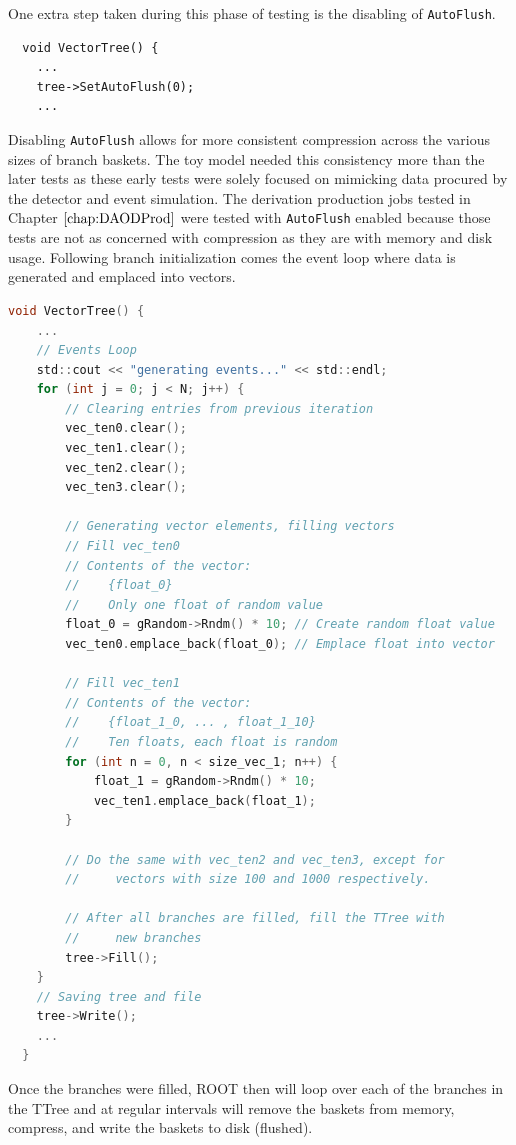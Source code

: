 One extra step taken during this phase of testing is the disabling of \verb|AutoFlush|. 
\begin{lstlisting}
  void VectorTree() {
    ...
    tree->SetAutoFlush(0);
    ...
\end{lstlisting}
Disabling \verb|AutoFlush| allows for more consistent compression across the various sizes of branch baskets. 
The toy model needed this consistency more than the later tests as these early tests were solely focused on mimicking data procured by the detector and event simulation. 
The derivation production jobs tested in Chapter $\ref{chap:DAODProd}$ were tested with \verb|AutoFlush| enabled because those tests are not as concerned with compression as they are with memory and disk usage.
Following branch initialization comes the event loop where data is generated and emplaced into vectors.

\begin{lstlisting}[language=C]  
  void VectorTree() {
    ...
    // Events Loop
    std::cout << "generating events..." << std::endl;
    for (int j = 0; j < N; j++) {
        // Clearing entries from previous iteration
        vec_ten0.clear();
        vec_ten1.clear();
        vec_ten2.clear();
        vec_ten3.clear();

        // Generating vector elements, filling vectors
        // Fill vec_ten0 
        // Contents of the vector:
        //    {float_0}
        //    Only one float of random value
        float_0 = gRandom->Rndm() * 10; // Create random float value
        vec_ten0.emplace_back(float_0); // Emplace float into vector
        
        // Fill vec_ten1
        // Contents of the vector:
        //    {float_1_0, ... , float_1_10}
        //    Ten floats, each float is random
        for (int n = 0, n < size_vec_1; n++) {
            float_1 = gRandom->Rndm() * 10;
            vec_ten1.emplace_back(float_1);
        }

        // Do the same with vec_ten2 and vec_ten3, except for 
        //     vectors with size 100 and 1000 respectively. 
        
        // After all branches are filled, fill the TTree with 
        //     new branches
        tree->Fill();
    }
    // Saving tree and file
    tree->Write();
    ...
  }
\end{lstlisting}
Once the branches were filled, ROOT then will loop over each of the branches in the TTree and at regular intervals will remove the baskets from memory, compress, and write the baskets to disk (flushed).

